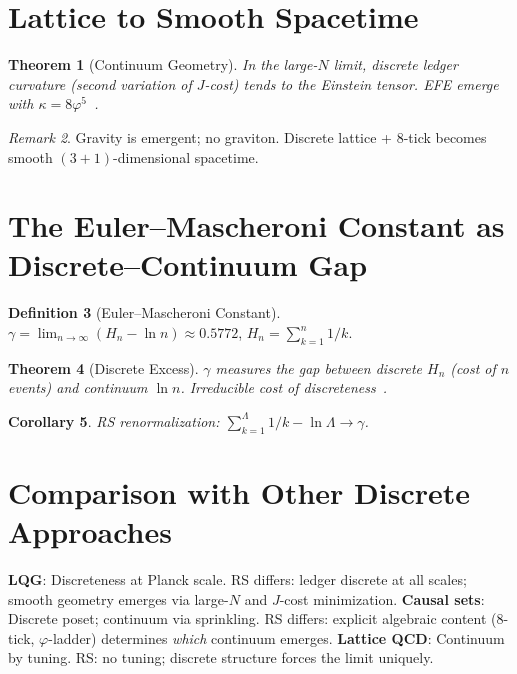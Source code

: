 \documentclass[12pt,a4paper]{article}
\newtheorem{theorem}{Theorem}[section]
\newtheorem{corollary}[theorem]{Corollary}
\theoremstyle{definition}
\newtheorem{definition}[theorem]{Definition}
\theoremstyle{remark}
\newtheorem{remark}[theorem]{Remark}
\begin{document}
\section{Lattice to Smooth Spacetime}
\label{sec:lattice-spacetime}

\begin{theorem}[Continuum Geometry]
In the large-$N$ limit, discrete ledger curvature (second variation of
$J$-cost) tends to the Einstein tensor.  EFE emerge with
$\kappa = 8\varphi^5$~\cite{RSEFE}.
\end{theorem}

\begin{remark}
Gravity is emergent; no graviton.  Discrete lattice + 8-tick becomes
smooth $(3+1)$-dimensional spacetime.
\end{remark}

\section{The Euler--Mascheroni Constant as Discrete--Continuum Gap}
\label{sec:gamma}

\begin{definition}[Euler--Mascheroni Constant]
$\gamma = \lim_{n\to\infty}(H_n - \ln n) \approx 0.5772$,
$H_n = \sum_{k=1}^n 1/k$.
\end{definition}

\begin{theorem}[Discrete Excess]
$\gamma$ measures the gap between discrete $H_n$ (cost of $n$ events)
and continuum $\ln n$.  Irreducible cost of discreteness~\cite{RSEuler}.
\end{theorem}

\begin{corollary}
RS renormalization: $\sum_{k=1}^\Lambda 1/k - \ln\Lambda \to \gamma$.
\end{corollary}

\section{Comparison with Other Discrete Approaches}
\label{sec:comparison}

\textbf{LQG}: Discreteness at Planck scale.  RS differs: ledger discrete
at all scales; smooth geometry emerges via large-$N$ and $J$-cost
minimization.  \textbf{Causal sets}: Discrete poset; continuum via
sprinkling.  RS differs: explicit algebraic content (8-tick,
$\varphi$-ladder) determines \emph{which} continuum emerges.
\textbf{Lattice QCD}: Continuum by tuning.  RS: no tuning; discrete
structure forces the limit uniquely.
\end{document}
